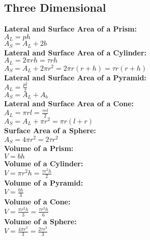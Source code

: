 \documentclass[12pt]{article}
\begin{document}
\subsection*{Three Dimensional}
\textbf{Lateral and Surface Area of a Prism:}
    \\ \( A_L = ph \)
    \\ \( A_S = A_L + 2b \)
\\ \textbf{Lateral and Surface Area of a Cylinder: }
    \\ \( A_L = 2 \pi rh = \tau rh \)
    \\ \( A_S = A_L + 2 \pi r^2 = 2 \pi r( r + h ) = \tau r( r + h ) \)
\\ \textbf{Lateral and Surface Area of a Pyramid:}
    \\ \( A_L = \displaystyle\frac{ pl }{ 2 } \)
    \\ \( A_S = A_L + A_b \)
\\ \textbf{Lateral and Surface Area of a Cone:}
    \\ \( A_L = \pi rl = \displaystyle\frac{ \tau rl }{ 2 } \)
    \\ \( A_S = A_L + \pi r^2 = \pi r ( l + r ) \)
\\ \textbf{Surface Area of a Sphere:}
    \\ \( A_S = 4 \pi r^2 = 2 \tau r^2 \)
\\ \textbf{Volume of a Prism:}
    \\ \( V = bh \)
\\ \textbf{Volume of a Cylinder:}
    \\ \( V = \pi r^2 h = \displaystyle\frac{ \tau r^2 h }{ 2 } \)
\\ \textbf{Volume of a Pyramid:}
    \\ \( V = \displaystyle\frac{ bh }{ 3 } \)
\\ \textbf{Volume of a Cone:}
    \\ \( V = \displaystyle\frac{ \pi r^2 h }{ 3 } = \displaystyle\frac{ \tau r^2 h }{ 6 } \)
\\ \textbf{Volume of a Sphere:}
    \\ \( V = \displaystyle\frac{ 4 \pi r^3 }{ 3 } = \displaystyle\frac{ 2 \tau r^3 }{ 3 } \)
\end{document}

